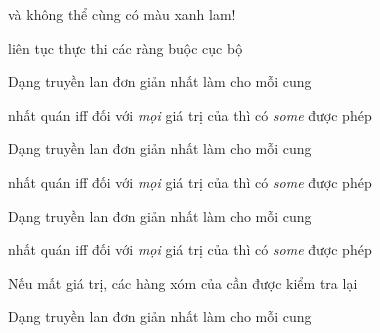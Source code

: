 \documentclass{article}
\begin{document}
\begin{huge}
\vspace*{0.1in}

\maxfigwidth
{}

 và  không thể cùng có màu xanh lam!

 liên tục thực thi các ràng buộc cục bộ


Dạng truyền lan đơn giản nhất làm cho mỗi cung 

 nhất quán iff\al
  đối với \emph{mọi} giá trị  của  thì có \emph{some} được phép 

\vspace*{0.1in}

\maxfigwidth
{}


Dạng truyền lan đơn giản nhất làm cho mỗi cung 

 nhất quán iff\al
  đối với \emph{mọi} giá trị  của  thì có \emph{some} được phép 

\vspace*{0.1in}

\maxfigwidth
{}


Dạng truyền lan đơn giản nhất làm cho mỗi cung 

 nhất quán iff\al
  đối với \emph{mọi} giá trị  của  thì có \emph{some} được phép 

\vspace*{0.1in}

\maxfigwidth
{}

Nếu  mất giá trị, các hàng xóm của  cần được kiểm tra lại


Dạng truyền lan đơn giản nhất làm cho mỗi cung 


\end{huge}
\end{document}
